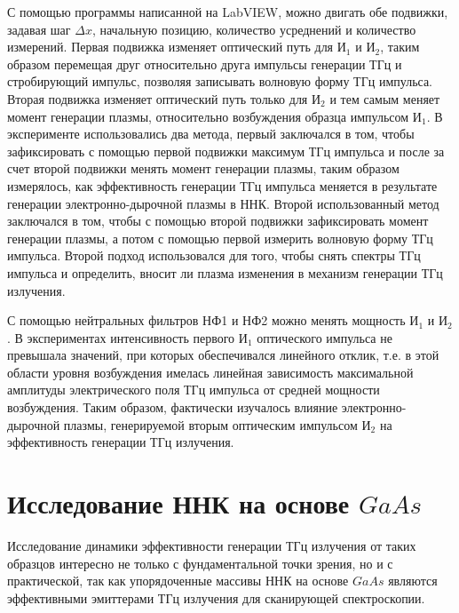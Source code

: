 \documentclass[a4paper,14pt,russian]{extreport}
\begin{document}
			С помощью программы написанной на LabVIEW, можно двигать обе подвижки, задавая шаг $\Delta x$, начальную позицию, количество усреднений и количество измерений. Первая подвижка изменяет оптический путь для $\text{И}_1$ и $\text{И}_2$, таким образом перемещая друг относительно друга импульсы генерации ТГц и стробирующий импульс, позволяя записывать волновую форму ТГц импульса. Вторая подвижка изменяет оптический путь только для $\text{И}_2$ и тем самым меняет момент генерации плазмы, относительно возбуждения образца импульсом $\text{И}_1$. В эксперименте использовались два метода, первый заключался в том, чтобы зафиксировать с помощью первой подвижки максимум ТГц импульса и после за счет второй подвижки менять момент генерации плазмы, таким образом измерялось, как эффективность генерации ТГц импульса меняется в результате генерации электронно-дырочной плазмы в ННК. Второй использованный метод заключался в том, чтобы с помощью второй подвижки зафиксировать момент генерации плазмы, а потом с помощью первой измерить волновую форму ТГц импульса. Второй подход использовался для того, чтобы снять спектры ТГц импульса и определить, вносит ли плазма изменения в механизм генерации ТГц излучения.\par
			С помощью нейтральных фильтров НФ1 и НФ2 можно менять мощность $\text{И}_1$ и $\text{И}_2$. В экспериментах интенсивность первого $\text{И}_1$ оптического импульса не превышала значений, при которых обеспечивался линейного отклик, т.е. в этой области уровня возбуждения имелась линейная зависимость максимальной амплитуды электрического поля ТГц импульса от средней мощности возбуждения. Таким образом, фактически изучалось влияние электронно-дырочной плазмы, генерируемой вторым  оптическим импульсом $\text{И}_2$ на эффективность генерации ТГц излучения.
		\section{Исследование ННК на основе $GaAs$}
			Исследование динамики эффективности генерации ТГц излучения от таких образцов интересно не только с фундаментальной точки зрения, но и с практической, так как упорядоченные массивы ННК на основе $GaAs$ являются эффективными эмиттерами ТГц излучения для сканирующей спектроскопии.
\end{document}
